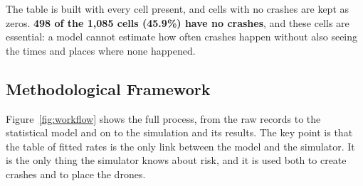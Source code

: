 \documentclass[11pt]{article}
\begin{document}
The table is built with every cell present, and cells with no crashes are kept
as zeros. \textbf{498 of the 1{,}085 cells (45.9\%) have no crashes}, and
these cells are essential: a model cannot estimate how often crashes happen
without also seeing the times and places where none happened.

\subsection{Methodological Framework}

Figure~\ref{fig:workflow} shows the full process, from the raw records to the
statistical model and on to the simulation and its results. The key point is
that the table of fitted rates is the only link between the model and the
simulator. It is the only thing the simulator knows about risk, and it is used
both to create crashes and to place the drones.
\end{document}
